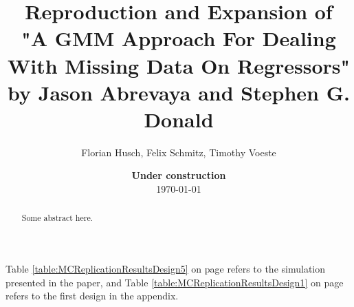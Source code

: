 \documentclass[11pt, a4paper, leqno]{article}
\begin{document}
\title{Reproduction and Expansion of \\"A GMM Approach For Dealing With Missing Data On Regressors" by Jason Abrevaya and Stephen G. Donald}

\author{Florian Husch, Felix Schmitz, Timothy Voeste}

\date{
    {\bf Under construction}
    \\[1ex]
    \today
}

\maketitle
{}

\begin{abstract}
    Some abstract here.
\end{abstract}

\clearpage







Table \ref{table:MCReplicationResultsDesign5} on page \pageref{table:MCReplicationResultsDesign5} refers
to the simulation presented in the paper, and Table \ref{table:MCReplicationResultsDesign1} on page \pageref{table:MCReplicationResultsDesign1}
refers to the first design in the appendix.


\end{document}
